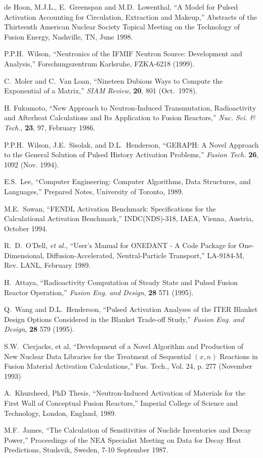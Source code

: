 \begin{thebibliography}{100}
 de Hoon, M.J.L., E.~Greenspan and
  M.D.~Lowenthal, ``A Model for Pulsed Activation Accounting for
  Circulation, Extraction and Makeup,'' Abstracts of the Thirteenth
  American Nuclear Society Topical Meeting on the Technology of Fusion
  Energy, Nashville, TN, June 1998.

 P.P.H.~Wilson, ``Neutronics of the IFMIF Neutron
  Source: Development and Analysis,'' Forschungszentrum Karlsruhe,
  FZKA-6218 (1999).
  
 C.~Moler and C.~Van Loan, ``Nineteen Dubious Ways to
  Compute the Exponential of a Matrix,'' \textsl{SIAM
    Review}, \textbf{20}, 801 (Oct.~1978).
  
 H. Fukumoto, ``New Approach to
  Neutron-Induced Transmutation, Radioactivity and Afterheat
  Calculations and Its Application to Fusion Reactors,'' \textsl{Nuc. Sci.
  \& Tech.}, \textbf{23}, 97, February 1986.
  
 P.P.H.~Wilson, J.E.~Sisolak, and D.L.~Henderson,
  ``GERAPH: A Novel Approach to the General Solution of Pulsed History
  Activation Problems,'' \textsl{Fusion Tech.} \textbf{26}, 1092 (Nov.
  1994).
  
 E.S.~Lee, ``Computer Engineering: Computer
  Algorithms, Data Structures, and Languages,'' Prepared Notes,
  University of Toronto, 1989.

M.E.~Sawan, ``FENDL Activation
  Benchmark: Specifications for the Calculational Activation
  Benchmark,'' INDC(NDS)-318, IAEA, Vienna, Austria, October 1994.

R.~D.~O'Dell, \textsl{et al.}, ``User's Manual
  for ONEDANT - A Code Package for One-Dimensional,
  Diffusion-Accelerated, Neutral-Particle Transport,'' LA-9184-M, Rev.
  LANL, February 1989.
  
 H.~Attaya, ``Radioactivity Computation of Steady
  State and Pulsed Fusion Reactor Operation,'' \textsl{Fusion Eng. and
  Design}, \textbf{28} 571 (1995).

 Q.~Wang and D.L.~Henderson, ``Pulsed Activation
  Analyses of the ITER Blanket Design Options Considered in the
  Blanket Trade-off Study,'' \textsl{Fusion Eng. and Design},
  \textbf{28} 579 (1995).

 S.W.~Cierjacks, et al, ``Development of a
  Novel Algorithm and Production of New Nuclear Data Libraries for the
  Treatment of Sequential $(x,n)$ Reactions in Fusion Material
  Activation Calculations,'' Fus. Tech., Vol. 24, p. 277 (November
  1993)
    
 A.~Khursheed, PhD Thesis, ``Neutron-Induced
  Activation of Materials for the First Wall of Conceptual Fusion
  Reactors,'' Imperial College of Science and Technology, London,
  England, 1989.
    
 M.F.~James, ``The Calculation of Sensitivities
  of Nuclide Inventories and Decay Power,'' Proceedings of the NEA
  Specialist Meeting on Data for Decay Heat Predictions, Studsvik,
  Sweden, 7-10 September 1987.
    
  
\end{thebibliography}
